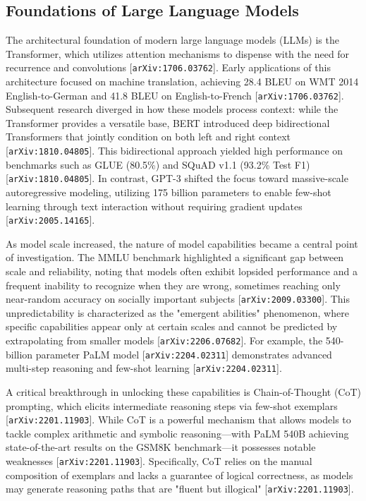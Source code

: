 \documentclass[11pt]{article}
\begin{document}
\subsection{Foundations of Large Language Models}

The architectural foundation of modern large language models (LLMs) is the Transformer, which utilizes attention mechanisms to dispense with the need for recurrence and convolutions [\texttt{arXiv:1706.03762}]. Early applications of this architecture focused on machine translation, achieving 28.4 BLEU on WMT 2014 English-to-German and 41.8 BLEU on English-to-French [\texttt{arXiv:1706.03762}]. Subsequent research diverged in how these models process context: while the Transformer provides a versatile base, BERT introduced deep bidirectional Transformers that jointly condition on both left and right context [\texttt{arXiv:1810.04805}]. This bidirectional approach yielded high performance on benchmarks such as GLUE (80.5\%) and SQuAD v1.1 (93.2\% Test F1) [\texttt{arXiv:1810.04805}]. In contrast, GPT-3 shifted the focus toward massive-scale autoregressive modeling, utilizing 175 billion parameters to enable few-shot learning through text interaction without requiring gradient updates [\texttt{arXiv:2005.14165}].

As model scale increased, the nature of model capabilities became a central point of investigation. The MMLU benchmark highlighted a significant gap between scale and reliability, noting that models often exhibit lopsided performance and a frequent inability to recognize when they are wrong, sometimes reaching only near-random accuracy on socially important subjects [\texttt{arXiv:2009.03300}]. This unpredictability is characterized as the "emergent abilities" phenomenon, where specific capabilities appear only at certain scales and cannot be predicted by extrapolating from smaller models [\texttt{arXiv:2206.07682}]. For example, the 540-billion parameter PaLM model [\texttt{arXiv:2204.02311}] demonstrates advanced multi-step reasoning and few-shot learning [\texttt{arXiv:2204.02311}].

A critical breakthrough in unlocking these capabilities is Chain-of-Thought (CoT) prompting, which elicits intermediate reasoning steps via few-shot exemplars [\texttt{arXiv:2201.11903}]. While CoT is a powerful mechanism that allows models to tackle complex arithmetic and symbolic reasoning—with PaLM 540B achieving state-of-the-art results on the GSM8K benchmark—it possesses notable weaknesses [\texttt{arXiv:2201.11903}]. Specifically, CoT relies on the manual composition of exemplars and lacks a guarantee of logical correctness, as models may generate reasoning paths that are "fluent but illogical" [\texttt{arXiv:2201.11903}].
\end{document}
